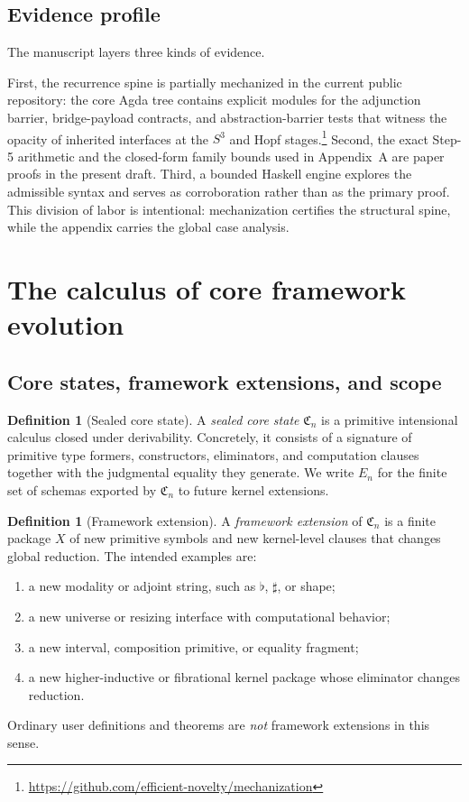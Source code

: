 \documentclass{lmcs}
\theoremstyle{plain}
\theoremstyle{definition}
\newtheorem{defi}[thm]{Definition}
\theoremstyle{remark}
\newcommand{\Core}{\ensuremath{\mathfrak{C}}}
\begin{document}
\subsection{Evidence profile}

The manuscript layers three kinds of evidence.

First, the recurrence spine is partially mechanized in the current public repository: the core Agda tree contains explicit modules for the adjunction barrier, bridge-payload contracts, and abstraction-barrier tests that witness the opacity of inherited interfaces at the $S^3$ and Hopf stages.\footnote{\url{https://github.com/efficient-novelty/mechanization}} Second, the exact Step-5 arithmetic and the closed-form family bounds used in Appendix~A are paper proofs in the present draft. Third, a bounded Haskell engine explores the admissible syntax and serves as corroboration rather than as the primary proof. This division of labor is intentional: mechanization certifies the structural spine, while the appendix carries the global case analysis.

\section{The calculus of core framework evolution}
\label{sec:calculus}

\subsection{Core states, framework extensions, and scope}

\begin{defi}[Sealed core state]
A \emph{sealed core state} $\Core_n$ is a primitive intensional calculus closed under derivability.
Concretely, it consists of a signature of primitive type formers, constructors, eliminators, and computation clauses together with the judgmental equality they generate.
We write $E_n$ for the finite set of schemas exported by $\Core_n$ to future kernel extensions.
\end{defi}

\begin{defi}[Framework extension]
A \emph{framework extension} of $\Core_n$ is a finite package $X$ of new primitive symbols and new kernel-level clauses that changes global reduction.
The intended examples are:
\begin{enumerate}[label=(\alph*),nosep]
  \item a new modality or adjoint string, such as $\flat$, $\sharp$, or shape;
  \item a new universe or resizing interface with computational behavior;
  \item a new interval, composition primitive, or equality fragment;
  \item a new higher-inductive or fibrational kernel package whose eliminator changes reduction.
\end{enumerate}
Ordinary user definitions and theorems are \emph{not} framework extensions in this sense.
\end{defi}
\end{document}
